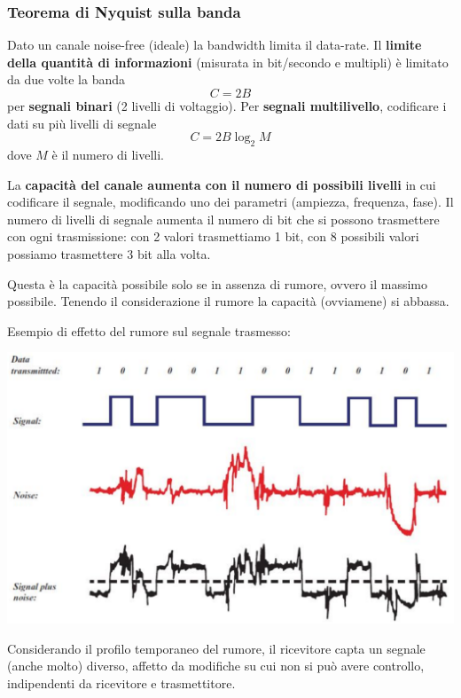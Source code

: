 \subsubsection{Teorema di Nyquist sulla banda}

Dato un canale noise-free (ideale) la bandwidth limita il data-rate. Il \textbf{limite della quantità di informazioni} (misurata in bit/secondo e multipli) è limitato da due volte la banda
$$ C = 2B $$
per \textbf{segnali binari} (2 livelli di voltaggio). Per \textbf{segnali multilivello}, codificare i dati su più livelli di segnale
$$ C = 2B \log_2 M $$
dove $M$ è il numero di livelli.

La \textbf{capacità del canale aumenta con il numero di possibili livelli} in cui codificare il segnale, modificando uno dei parametri (ampiezza, frequenza, fase). Il numero di livelli di segnale aumenta il numero di bit che si possono trasmettere con ogni trasmissione: con 2 valori trasmettiamo 1 bit, con 8 possibili valori possiamo trasmettere 3 bit alla volta. 

Questa è la capacità possibile solo se in assenza di rumore, ovvero il massimo possibile. Tenendo il considerazione il rumore la capacità (ovviamene) si abbassa.

Esempio di effetto del rumore sul segnale trasmesso: 
\begin{center}
	\includegraphics[width=\linewidth]{img/PTT/errors1}
\end{center}

Considerando il profilo temporaneo del rumore, il ricevitore capta un segnale (anche molto) diverso, affetto da modifiche su cui non si può avere controllo, indipendenti da ricevitore e trasmettitore.


